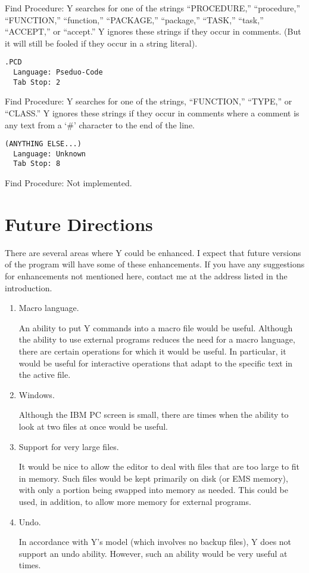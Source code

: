 Find Procedure: Y searches for one of the strings ``PROCEDURE,'' ``procedure,'' ``FUNCTION,''
``function,'' ``PACKAGE,'' ``package,'' ``TASK,'' ``task,'' ``ACCEPT,'' or ``accept.'' Y ignores
these strings if they occur in comments. (But it will still be fooled if they occur in a string
literal).

\begin{verbatim}
.PCD
  Language: Pseduo-Code
  Tab Stop: 2
\end{verbatim}

Find Procedure: Y searches for one of the strings, ``FUNCTION,'' ``TYPE,'' or ``CLASS.'' Y
ignores these strings if they occur in comments where a comment is any text from a `\#'
character to the end of the line.

\begin{verbatim}
(ANYTHING ELSE...)
  Language: Unknown
  Tab Stop: 8
\end{verbatim}

Find Procedure: Not implemented.

\section{Future Directions}

There are several areas where Y could be enhanced. I expect that future versions of the program
will have some of these enhancements. If you have any suggestions for enhancements not mentioned
here, contact me at the address listed in the introduction.

\begin{enumerate}

\item Macro language.

  An ability to put Y commands into a macro file would be useful. Although the ability to use
  external programs reduces the need for a macro language, there are certain operations for
  which it would be useful. In particular, it would be useful for interactive operations that
  adapt to the specific text in the active file.

\item Windows.

  Although the IBM PC screen is small, there are times when the ability to look at two files at
  once would be useful.

\item Support for very large files.

  It would be nice to allow the editor to deal with files that are too large to fit in memory.
  Such files would be kept primarily on disk (or EMS memory), with only a portion being swapped
  into memory as needed. This could be used, in addition, to allow more memory for external
  programs.

\item Undo.

  In accordance with Y's model (which involves no backup files), Y does not support an undo
  ability. However, such an ability would be very useful at times.

\end{enumerate}

